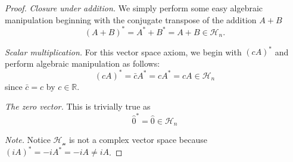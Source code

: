 \documentclass[12pt]{amsart}
\begin{document}
\begin{onehalfspace}
\begin{proof}
            \emph{Closure under addition.} We simply perform some easy algebraic manipulation beginning with the
            conjugate transpose of the addition $A + B$
            \begin{displaymath}
                (A + B)^* = A^* + B^* = A + B \in\mathcal{H}_n.
            \end{displaymath}

            \emph{Scalar multiplication.} For this vector space axiom, we begin with $(cA)^*$ and perform algebraic
            manipulation as follows:
            \begin{displaymath}
                (cA)^* = \bar{c}A^* = cA^* = cA \in\mathcal{H}_n
            \end{displaymath}
            since $\bar{c} = c$ by $c\in\mathbb{R}$.

            \emph{The zero vector.} This is trivially true as
            \begin{displaymath}
                \hat{0}^* = \hat{0} \in\mathcal{H}_n
            \end{displaymath}

            \emph{Note.} Notice $\mathcal{H_n}$ is not a complex vector space because $(iA)^* = -iA^* = -iA\neq iA$.
        \end{proof}


\end{onehalfspace}
\end{document}
